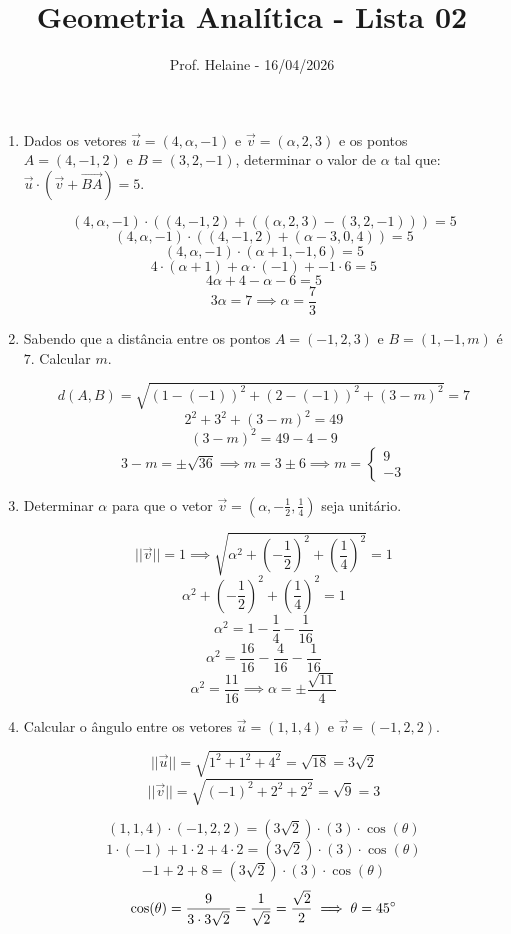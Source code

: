 \documentclass[
  12pt,
  openright,
  a4paper,
  twoside,
  english,
  brazil,
]{article}
\title{Geometria Analítica - Lista 02}
\author{Prof. Helaine - 16/04/2026}
\date{}
\begin{document}
\maketitle

\begin{enumerate}[\bfseries  1.]
  \item Dados os vetores $\vec u = (4,\alpha, -1)$ e
    $\vec v =(\alpha,2,3)$ e os pontos $A=(4,-1,2)$ e $B=(3,2,-1)$,
    determinar o valor de $\alpha$ tal que: $\vec u\cdot(\vec
    v+\overrightarrow{BA})=5$.

    $$
    (4,\alpha,-1)\cdot ((4,-1,2)+((\alpha,2,3)-(3,2,-1)))=5
    $$
    $$
    (4,\alpha,-1)\cdot ((4,-1,2)+(\alpha-3,0,4))=5
    $$
    $$
    (4,\alpha,-1)\cdot (\alpha+1,-1,6)=5
    $$
    $$
    4\cdot (\alpha+1) + \alpha\cdot (-1) + -1\cdot 6=5
    $$
    $$
    4\alpha+4-\alpha-6=5
    $$
    $$
    3\alpha=7\implies \alpha=\frac 7 3
    $$

  \item Sabendo que a distância entre os pontos $A=(-1,2,3)$ e
    $B=(1,-1,m)$ é $7$. Calcular $m$.

    $$
    d(A,B)=\sqrt{(1-(-1))^2+(2-(-1))^2+(3-m)^2}=7
    $$
    $$
    2^2+3^2+(3-m)^2=49
    $$
    $$
    (3-m)^2=49-4-9
    $$
    $$
    3-m=\pm\sqrt{36}\implies m=3\pm6\implies m=
    \begin{cases}
      9\\
      -3
    \end{cases}
    $$

  \item Determinar $\alpha$ para que o vetor $\vec v=(\alpha,-\frac 1
    2, \frac 1 4)$ seja unitário.

    $$
    ||\vec v||=1\implies \sqrt{\alpha^2+(-\frac 1 2)^2+(\frac 1 4)^2}=1
    $$
    $$
    \alpha^2+(-\frac 1 2)^2+(\frac 1 4)^2=1
    $$
    $$
    \alpha^2=1-\frac 1 4-\frac 1 {16}
    $$
    $$
    \alpha^2=\frac{16}{16}-\frac{4}{16}-\frac 1 {16}
    $$
    $$
    \alpha^2=\frac{11}{16}\implies \alpha=\pm \frac{\sqrt{11}}{4}
    $$

  \item Calcular o ângulo entre os vetores $\vec u = (1,1,4)$ e $\vec
    v=(-1,2,2)$.

    $$
    ||\vec u||=\sqrt{1^2+1^2+4^2}=\sqrt{18}=3\sqrt{2}
    $$
    $$
    ||\vec v||=\sqrt{(-1)^2+2^2+2^2}=\sqrt{9}=3
    $$

    $$
    (1,1,4)\cdot(-1,2,2)=(3\sqrt{2})\cdot(3)\cdot \cos(\theta)
    $$
    $$
    1\cdot(-1)+1\cdot 2+4\cdot 2=(3\sqrt{2})\cdot(3)\cdot \cos(\theta)
    $$
    $$
    -1+2+8=(3\sqrt{2})\cdot(3)\cdot \cos(\theta)
    $$
    $$
    \cos(\theta)=\frac{9}{3\cdot
    3\sqrt{2}}=\frac{1}{\sqrt{2}}=\frac{\sqrt 2}{2}\implies \theta=45\degree
    $$


\end{enumerate}
\end{document}
